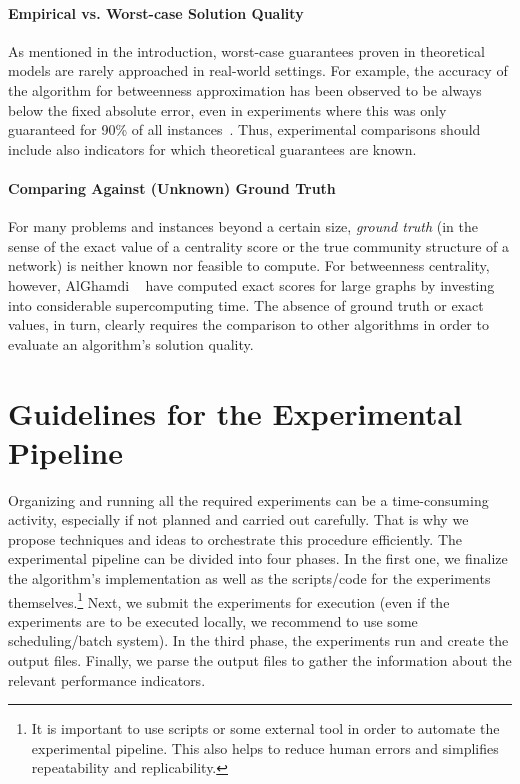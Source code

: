 \documentclass[algorithms,article,submit,moreauthors,pdftex]{Definitions/mdpi}
\newcommand{\changed}[1]{#1}
\begin{document}
\paragraph*{Empirical vs. Worst-case Solution Quality}
As mentioned in the introduction, worst-case guarantees proven in theoretical models
are rarely approached in real-world settings.
For example, the accuracy of the  algorithm for betweenness approximation
has been observed to be always below the
fixed absolute error, even in experiments where this was only guaranteed
for 90\% of all instances~\cite{riondato2018abra}.
Thus, experimental comparisons should include also \changed{indicators} for which theoretical
guarantees are known.

\paragraph*{Comparing Against (Unknown) Ground Truth}
%
For many problems and instances beyond a certain size, \emph{ground truth}
(in the sense of the exact value of a centrality score or the true community structure of a network)
is neither known nor feasible to compute.
For betweenness centrality, however, AlGhamdi \etal~\cite{alghamdi2017} have computed exact scores
for large graphs by investing into considerable supercomputing time.
The absence of ground truth or exact values, in turn, clearly requires the comparison to
other algorithms in order to evaluate an algorithm's solution quality.

\section{Guidelines for the Experimental Pipeline}
\label{sec:exp-pipeline}

Organizing and running all the required experiments can be a time-consuming activity, especially
if not planned and carried out carefully. That is why we propose techniques and ideas
to orchestrate this procedure efficiently.
The experimental pipeline can be divided into four phases.
In the first one, we finalize the algorithm's implementation as well as the scripts/code for the experiments themselves.\footnote{It is important to use scripts or some external tool in order to automate the experimental pipeline.
This also helps to reduce human errors and  simplifies repeatability and replicability.
}
Next, we submit the experiments for execution (even if the experiments  are to be executed locally,
we \changed{recommend} to use some scheduling/batch system).
In the third phase, the experiments run and create the output files. Finally, we parse the output files
to gather the information about the relevant \changed{performance indicators}.
\end{document}
